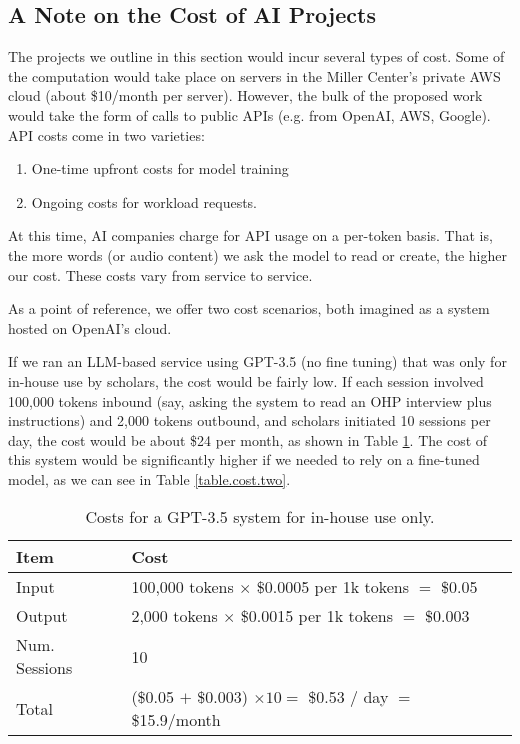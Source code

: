 \documentclass[12pt, oneside]{article}   	%
\begin{document}
\subsection{A Note on the Cost of AI Projects}\label{section.applications.cost}
The projects we outline in this section would incur several  types of cost.  Some of the computation would take place on servers in the Miller Center's private AWS cloud (about \$10/month per server).  However, the bulk of the proposed work would take the form of calls to public APIs (e.g. from OpenAI, AWS, Google).  API costs come in two varieties:
\begin{enumerate}
\item One-time upfront costs for model training
\item Ongoing costs for workload requests.
\end{enumerate}
At this time, AI companies charge for API usage on a per-token basis.  That is, the more words (or audio content) we ask the model to read or create, the higher our cost.  These costs vary from service to service.  

As a point of reference, we offer two cost scenarios, both imagined as a system hosted on OpenAI's cloud.

If we ran an LLM-based service using GPT-3.5 (no fine tuning) that was only for in-house use by scholars, the cost would be fairly low.  If each session involved 100,000 tokens inbound (say, asking the system to read an OHP interview plus instructions) and 2,000 tokens outbound, and scholars initiated 10 sessions per day, the cost  would be about \$24 per month, as shown in Table \ref{table.cost.one}.  The cost of this system would be significantly higher if we needed to rely on a fine-tuned model, as we can see in Table \ref{table.cost.two}.

\begin{table}[htp]
\caption{Costs for a GPT-3.5 system for in-house use only.}
\begin{center}
\begin{tabular}{p{1.55in} p{4in}}
\toprule
Item			&		Cost	\\
\midrule
Input			&	100,000 tokens $\times$ \$0.0005 per 1k tokens $=$ \$0.05	\\
\midrule
Output		&	2,000 tokens $\times$ \$0.0015 per 1k tokens $=$ \$0.003	\\
\midrule
Num. Sessions	&	10	\\
\bottomrule			
Total			&	(\$0.05 $+$ \$0.003)	$\times 10 =$ \$0.53 / day $=$ \$15.9/month	\\
\bottomrule
\end{tabular}
\end{center}
\label{table.cost.one}
\end{table}%
\end{document}
